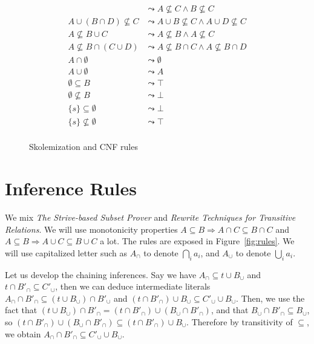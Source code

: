 \documentclass{article}
\begin{document}
\begin{figure}[htbp]
\begin{center}
\begin{align*}
    & \leadsto A \not\subseteq C \land B \not\subseteq C \\
A \cup (B \cap D) \not\subseteq C
    & \leadsto A \cup B \not\subseteq C \land A \cup D \not\subseteq C \\
A \not\subseteq B \cup C
    & \leadsto A \not\subseteq B \land A \not\subseteq C \\
A \not\subseteq B \cap (C \cup D)
    & \leadsto A \not\subseteq B \cap C \land A \not\subseteq B \cap D \\
A \cap \emptyset
    & \leadsto \emptyset \\
A \cup \emptyset
    & \leadsto A \\
\emptyset \subseteq B
    & \leadsto \top \\
\emptyset \not\subseteq B
    & \leadsto \bot \\
\{ s \} \subseteq \emptyset
    & \leadsto \bot \\
\{ s \} \not\subseteq \emptyset
    & \leadsto \top \\
\end{align*}
\caption{Skolemization and CNF rules}
\label{fig:skolem}
\end{center}
\end{figure}



\section{Inference Rules}
We mix \emph{The Strive-based Subset Prover} and
\emph{Rewrite Techniques for Transitive Relations}.
We will use monotonicity properties $A \subseteq B \Rightarrow A \cap C
\subseteq B \cap C$ and $A \subseteq B \Rightarrow A \cup C \subseteq B \cup C$
a lot. The rules are exposed in Figure~\ref{fig:rules}. We will use capitalized
letter such as $A_\cap$ to denote $\bigcap_i a_i$, and $A_\cup$ to denote
$\bigcup_i a_i$.

Let us develop the chaining inferences. Say we have $A_\cap \subseteq t\cup B_\cup$
and $t \cap B'_\cap \subseteq C'_\cup$, then we can deduce intermediate literals
$A_\cap \cap B'_\cap \subseteq (t \cup B_\cup) \cap B'_\cup$ and
$(t\cap B'_\cap)\cup B_\cup \subseteq C'_\cup \cup B_\cup$. Then, we use the fact that
$(t \cup B_\cup) \cap B'_\cap = (t\cap B'_\cap) \cup (B_\cup\cap B'_\cap)$, and that
$B_\cup \cap B'_\cap \subseteq B_\cup$, so
$(t\cap B'_\cap) \cup (B_\cup\cap B'_\cap) \subseteq (t \cap B'_\cap)\cup B_\cup$.
Therefore by transitivity of $\subseteq$, we obtain
$A_\cap\cap B'_\cap \subseteq C'_\cup \cup B_\cup$.
\end{document}
